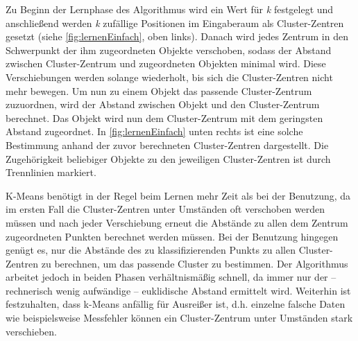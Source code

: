 Zu Beginn der Lernphase des Algorithmus wird ein Wert für \emph{k} festgelegt und anschließend werden \emph{k} zufällige Positionen im Eingaberaum als Cluster-Zentren gesetzt (siehe \autoref{fig:lernenEinfach}, oben links). Danach wird jedes Zentrum in den Schwerpunkt der ihm zugeordneten Objekte verschoben, sodass der Abstand zwischen Cluster-Zentrum und zugeordneten Objekten minimal wird. Diese Verschiebungen werden solange wiederholt, bis sich die Cluster-Zentren nicht mehr bewegen. 
Um nun zu einem Objekt das passende Cluster-Zentrum zuzuordnen, wird der Abstand zwischen Objekt und den Cluster-Zentrum berechnet. Das Objekt wird nun dem Cluster-Zentrum mit dem geringsten Abstand zugeordnet. In \autoref{fig:lernenEinfach} unten rechts ist  eine solche Bestimmung anhand der zuvor berechneten Cluster-Zentren dargestellt. Die Zugehörigkeit beliebiger Objekte zu den jeweiligen Cluster-Zentren ist durch Trennlinien markiert.


K-Means benötigt in der Regel beim Lernen mehr Zeit als bei der Benutzung, da im ersten Fall die Cluster-Zentren unter Umständen oft verschoben werden müssen und nach jeder Verschiebung erneut die Abstände zu allen dem Zentrum zugeordneten Punkten berechnet werden müssen. Bei der Benutzung hingegen genügt es, nur die Abstände des zu klassifizierenden Punkts zu allen Cluster-Zentren zu berechnen, um das passende Cluster zu bestimmen. Der Algorithmus arbeitet jedoch
in beiden Phasen verhältnismäßig schnell, da immer nur 
der -- rechnerisch wenig aufwändige -- euklidische Abstand ermittelt wird.
Weiterhin ist festzuhalten, dass k-Means anfällig für Ausreißer ist, d.h. einzelne falsche Daten wie beispielsweise Messfehler können ein Cluster-Zentrum unter Umständen stark verschieben.

